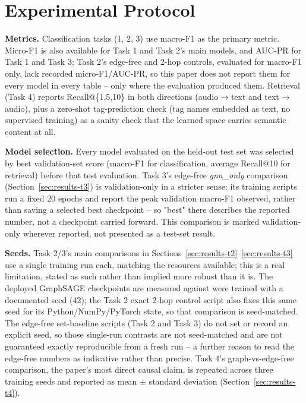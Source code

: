 \section{Experimental Protocol}\label{sec:protocol}

\textbf{Metrics.} Classification tasks (1, 2, 3) use macro-F1 as the primary metric. Micro-F1
is also available for Task 1 and Task 2's main models, and AUC-PR for Task 1 and Task 3; Task
2's edge-free and 2-hop controls, evaluated for macro-F1 only, lack recorded
micro-F1/AUC-PR, so this paper does not report them for every model in every table -- only
where the evaluation produced them. Retrieval (Task 4) reports Recall@\{1,5,10\} in both
directions (audio$\to$text and text$\to$audio), plus a zero-shot tag-prediction check (tag
names embedded as text, no supervised training) as a sanity check that the learned space
carries semantic content at all.

\textbf{Model selection.} Every model evaluated on the held-out test set was selected by
best validation-set score (macro-F1 for classification, average Recall@10 for retrieval)
before that test evaluation. Task 3's edge-free \textit{gnn\_only} comparison
(Section~\ref{sec:results-t3}) is validation-only in a stricter sense: its training scripts
run a fixed 20 epochs and report the peak validation macro-F1 observed, rather than saving a
selected best checkpoint -- so "best" there describes the reported number, not a checkpoint
carried forward. This comparison is marked validation-only wherever reported, not presented
as a test-set result.

\textbf{Seeds.} Task 2/3's main comparisons in Sections~\ref{sec:results-t2}--\ref{sec:results-t3}
use a single training run each, matching the resources available; this is a real limitation,
stated as such rather than implied more robust than it is. The deployed GraphSAGE checkpoints
are measured against were trained with a documented seed (42); the Task 2 exact 2-hop control
script also fixes this same seed for its Python/NumPy/PyTorch state, so that comparison is
seed-matched. The edge-free set-baseline scripts (Task 2 and Task 3) do not set or record an
explicit seed, so those single-run contrasts are not seed-matched and are not guaranteed
exactly reproducible from a fresh run -- a further reason to read the edge-free numbers as
indicative rather than precise. Task 4's graph-vs-edge-free comparison, the paper's most
direct causal claim, is repeated across three training seeds and reported as mean $\pm$
standard deviation (Section~\ref{sec:results-t4}).

